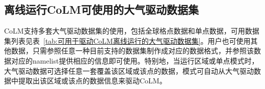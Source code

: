 \subsection{离线运行CoLM可使用的大气驱动数据集}
CoLM支持多套大气驱动数据集的使用，包括全球格点数据和单点数据，可用数据集列表见表~\ref{tab:可用于驱动CoLM离线运行的大气驱动数据集}。用户也可使用其他数据，只需参照任意一种目前支持的数据集制作成对应的数据格式，并参照该数据对应的namelist提供相应的信息即可使用。特别地，当运行区域或单点模式时，大气驱动数据可选择任意一套覆盖该区域或该点的数据，模式可自动从大气驱动数据中提取出该区域或该点的数据信息来驱动CoLM。


